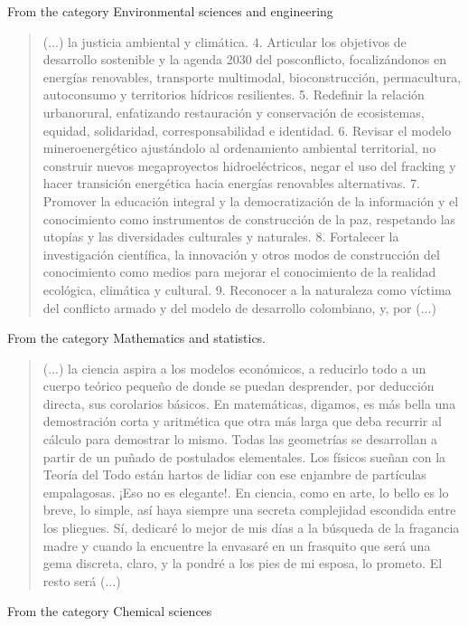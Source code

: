 \documentclass[12pt]{article}
\begin{document}
	From the category Environmental sciences and engineering
	
	\begin{quote}
		(...) la justicia ambiental y climática. 4. Articular los objetivos de desarrollo sostenible y la agenda 2030 del posconflicto, focalizándonos en energías renovables, transporte multimodal, bioconstrucción, permacultura, autoconsumo y territorios hídricos resilientes. 5. Redefinir la relación urbanorural, enfatizando restauración y conservación de ecosistemas, equidad, solidaridad, corresponsabilidad e identidad. 6. Revisar el modelo mineroenergético ajustándolo al ordenamiento ambiental territorial, no construir nuevos megaproyectos hidroeléctricos, negar el uso del fracking y hacer transición energética hacia energías renovables alternativas. 7. Promover la educación integral y la democratización de la información y el conocimiento como instrumentos de construcción de la paz, respetando las utopías y las diversidades culturales y naturales. 8. Fortalecer la investigación científica, la innovación y otros modos de construcción del conocimiento como medios para mejorar el conocimiento de la realidad ecológica, climática y cultural. 9. Reconocer a la naturaleza como víctima del conflicto armado y del modelo de desarrollo colombiano, y, por (...)
	\end{quote}
	
	From the category Mathematics and statistics.
	
	\begin{quote}
		(...) la ciencia aspira a los modelos económicos, a reducirlo todo a un cuerpo teórico pequeño de donde se puedan desprender, por deducción directa, sus corolarios básicos. En matemáticas, digamos, es más bella una demostración corta y aritmética que otra más larga que deba recurrir al cálculo para demostrar lo mismo. Todas las geometrías se desarrollan a partir de un puñado de postulados elementales. Los físicos sueñan con la Teoría del Todo están hartos de lidiar con ese enjambre de partículas empalagosas. ¡Eso no es elegante!. En ciencia, como en arte, lo bello es lo breve, lo simple, así haya siempre una secreta complejidad escondida entre los pliegues. Sí, dedicaré lo mejor de mis días a la búsqueda de la fragancia madre y cuando la encuentre la envasaré en un frasquito que será una gema discreta, claro, y la pondré a los pies de mi esposa, lo prometo. El resto será (...)
	\end{quote}
	
	From the category Chemical sciences
	
\end{document}
